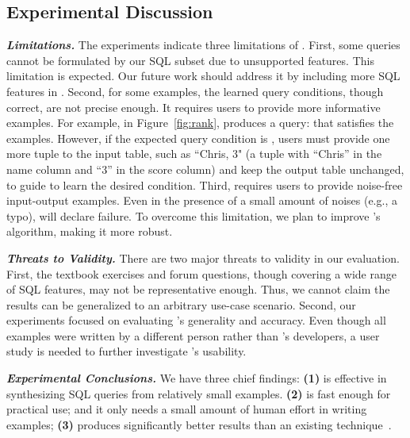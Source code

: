 \vspace{-1mm}
\subsection{Experimental Discussion}
\vspace{-1mm}

\enlargethispage{5pt}

\noindent \textbf{\textit{Limitations.}}
The experiments indicate three limitations
of \ourtool. First, some queries
cannot be formulated by our SQL subset
due to unsupported features. This limitation is expected.
Our future work
should address it by including more SQL
features in \ourtool.
Second, for some examples, the learned query
conditions, though correct, are not precise
enough. It requires users to provide more informative examples.
For example, in Figure~\ref{fig:rank}, \ourtool produces a 
query: 
that satisfies the examples. However, if
the expected query condition 
is , users must provide
one more tuple to the input table, such as ``Chris, 3"
(a tuple with ``Chris'' in the name column and ``3''
in the score column) and keep the output table
unchanged, 
to guide \ourtool to learn the desired condition.
Third, \ourtool requires
users to provide noise-free input-output examples.
Even in the presence of a small amount of 
noises (e.g., a typo), \ourtool will declare failure.
To overcome this limitation, we plan to improve \ourtool
's algorithm, making it more robust.

\vspace{.5mm}
\noindent \textbf{\textit{Threats to Validity.}}
There are two major threats to validity
in our evaluation. First, the \exnum textbook exercises
and \pnum forum questions, though covering
a wide range of SQL features, may not be representative enough.
Thus, we cannot claim the results can be generalized to an
arbitrary use-case scenario. Second, our
experiments focused on evaluating \ourtool's generality 
and accuracy. Even though all examples were written
by a different person rather than \ourtool's developers,
a user study is needed to further investigate
\ourtool's usability.


\vspace{.5mm}
\noindent \textbf{\textit{Experimental Conclusions.}}
We have three chief findings: \textbf{(1)}
\ourtool is effective in synthesizing SQL queries
from relatively small examples.
\textbf{(2)} \ourtool is fast enough for practical use;
and it only needs a small amount of human
effort in writing examples;
\textbf{(3)} \ourtool produces significantly better results
than an existing technique~\cite{Tran:2009}.




